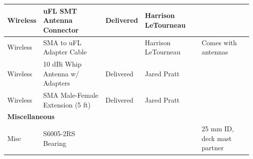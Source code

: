 \begin{table}[htbp]
\begin{tabular}{|p{2.2cm}|p{5.5cm}|p{2.2cm}|p{2.5cm}|p{3.5cm}|}
Wireless & uFL SMT Antenna Connector & Delivered & Harrison LeTourneau & \\
\hline
Wireless & SMA to uFL Adapter Cable & & Harrison LeTourneau & Comes with antennas \\
\hline
Wireless & 10 dBi Whip Antenna w/ Adapters & Delivered & Jared Pratt & \\
\hline
Wireless & SMA Male-Female Extension (5 ft) & Delivered & Jared Pratt & \\
\hline
\multicolumn{5}{|l|}{\textbf{Miscellaneous}} \\
\hline
Misc & S6005-2RS Bearing & & & 25 mm ID, deck mast partner \\
\hline
\end{tabular}
\end{table}

